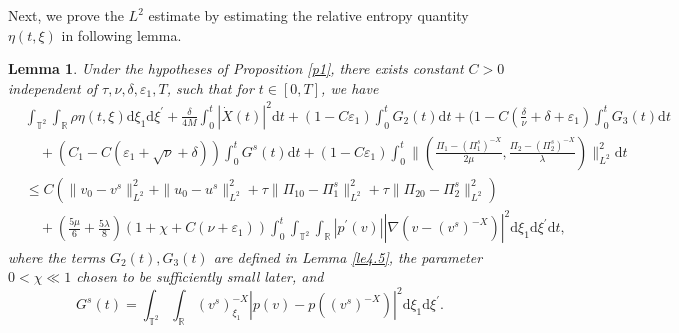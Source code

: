 \documentclass[10pt,reqno]{amsart}
\numberwithin{equation}{section}
\newtheorem{lemma}[theorem]{Lemma}
\newcommand{\dif}{\mathrm{d}}
\begin{document}
Next, we prove the $L^2$ estimate by estimating the relative entropy quantity $\eta(t, \xi)$ in following lemma.
\begin{lemma}\label{le0}
Under the hypotheses of Proposition \ref{p1}, there exists constant $C>0$ independent of $\tau, \nu, \delta, \varepsilon_1, T$, such that for $t\in[0, T]$, we have
\begin{equation}\label{ljgu1.1}
\begin{aligned}
& \int_{\mathbb{T}^2}\int_{\mathbb{R}}\rho\eta(t,\xi)\dif \xi_1\dif \xi^{\prime}
+\frac{\delta}{4M}\int_0^t|\dot X(t)|^2\dif t
+(1-C\varepsilon_1)\int_0^tG_2(t)\dif t
+(1-C(\frac{\delta}{\nu}+\delta+\varepsilon_1)\int_0^tG_3(t)\dif t\\
&\quad
+(C_1-C(\varepsilon_1+\sqrt\nu+\delta))\int_0^tG^s(t)\dif t
+(1-C\varepsilon_1)\int_0^t\|(\frac{\Pi_1-(\Pi_1^s)^{-X}}{2\mu}, \frac{\Pi_2-(\Pi_2^s)^{-X}}{\lambda})\|_{L^2}^2\dif t\\
&\le C\left(\|v_0-v^s\|_{L^2}^2+\|u_0-u^s\|_{L^2}^2+\tau\|\Pi_{10}-\Pi_1^s\|_{L^2}^2
+\tau\|\Pi_{20}-\Pi_2^s\|_{L^2}^2\right)\\
&\quad+(\frac{5\mu}{6}+\frac{5\lambda}{8})(1+\chi+C(\nu+\varepsilon_1))\int_0^t\int_{\mathbb{T}^2}\int_{\mathbb{R}}
|p^\prime(v)||\nabla(v-(v^s)^{-X})|^2
\dif \xi_1\dif \xi^{\prime}\dif t,
\end{aligned}
\end{equation}
where the terms $G_2(t),  G_{3}(t)$ are defined in Lemma \ref{le4.5}, the parameter $0<\chi\ll 1$ chosen to be sufficiently small later, and
\[
G^s(t)=\int_{\mathbb{T}^2}\int_{\mathbb{R}}(v^s)^{-X}_{\xi_1}|p(v)-p((v^s)^{-X})|^2\dif \xi_1\dif \xi^{\prime}.
\]
\end{lemma}
\end{document}
